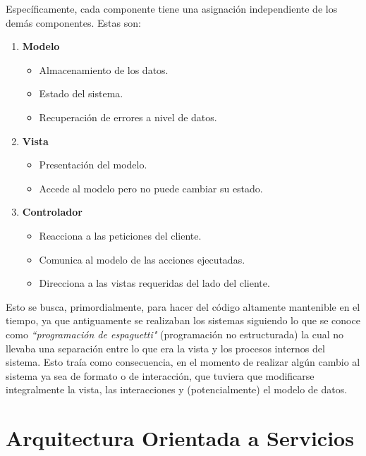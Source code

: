    Específicamente, cada componente tiene una asignación independiente de los demás componentes. Estas son:
    
    \begin{enumerate}
        \item \textbf{Modelo}
            \begin{itemize}
                \item Almacenamiento de los datos.
                \item Estado del sistema.
                \item Recuperación de errores a nivel de datos.
            \end{itemize}
        \item \textbf{Vista}
            \begin{itemize}
                \item Presentación del modelo.
                \item Accede al modelo pero no puede cambiar su estado.
            \end{itemize}
        \item \textbf{Controlador}
            \begin{itemize}
                \item Reacciona a las peticiones del cliente.
                \item Comunica al modelo de las acciones ejecutadas.
                \item Direcciona a las vistas requeridas del lado del cliente.
            \end{itemize}
    \end{enumerate}
    
    Esto se busca, primordialmente, para hacer del código altamente mantenible en el tiempo, ya que antiguamente se realizaban los sistemas siguiendo lo que se conoce como \textit{``programación de espaguetti"} (programación no estructurada) la cual no llevaba una separación entre lo que era la vista y los procesos internos del sistema. Esto traía como consecuencia, en el momento de realizar algún cambio al sistema ya sea de formato o de interacción, que tuviera que modificarse integralmente la vista, las interacciones y (potencialmente) el modelo de datos.
    
    \section{Arquitectura Orientada a Servicios}
    \label{teorico-soa}
    
